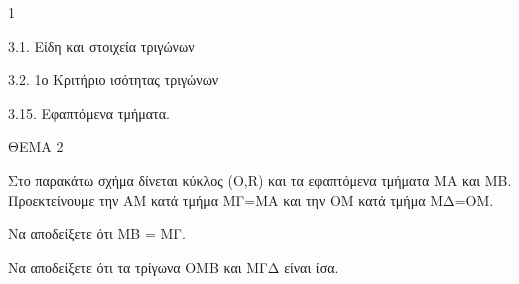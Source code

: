 \begin{ylh}{1}
    \item 3.1. Είδη και στοιχεία τριγώνων
    \item 3.2. 1ο Κριτήριο ισότητας τριγώνων
    \item 3.15. Εφαπτόμενα τμήματα.
\end{ylh}

ΘΕΜΑ 2

Στο παρακάτω σχήμα δίνεται κύκλος (O,R) και τα εφαπτόμενα τμήματα ΜΑ και ΜΒ. Προεκτείνουμε την ΑΜ κατά τμήμα ΜΓ=ΜΑ και την ΟΜ κατά τμήμα ΜΔ=ΟΜ.

\begin{alist}
\item Να αποδείξετε ότι ΜΒ = ΜΓ. 

\item Να αποδείξετε ότι τα τρίγωνα ΟΜΒ και ΜΓΔ είναι ίσα. 


\begin{center}
\end{center}
\end{alist}
